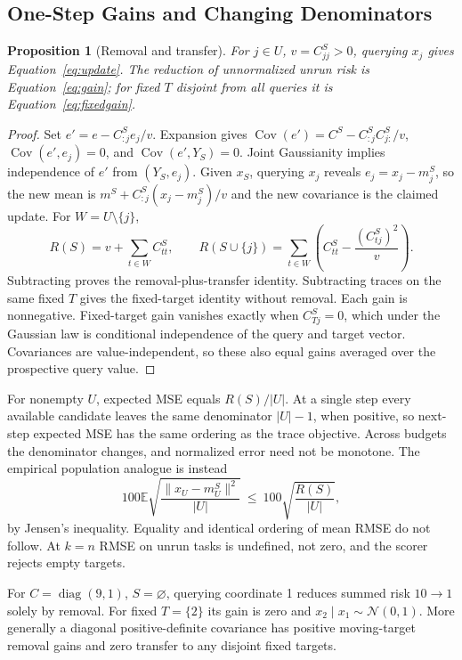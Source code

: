 \documentclass{article}
\newtheorem{proposition}{Proposition}
\newcommand{\E}{\mathbb{E}}
\newcommand{\Cov}{\operatorname{Cov}}
\begin{document}
\subsection{One-Step Gains and Changing Denominators}
\begin{proposition}[Removal and transfer]
For $j\in U$, $v=C^S_{jj}>0$, querying $x_j$ gives Equation~\eqref{eq:update}. The reduction of unnormalized unrun risk is Equation~\eqref{eq:gain}; for fixed $T$ disjoint from all queries it is Equation~\eqref{eq:fixedgain}.
\end{proposition}
\begin{proof}
Set $e'=e-C^S_{:j}e_j/v$. Expansion gives $\Cov(e')=C^S-C^S_{:j}C^S_{j:}/v$, $\Cov(e',e_j)=0$, and $\Cov(e',Y_S)=0$. Joint Gaussianity implies independence of $e'$ from $(Y_S,e_j)$. Given $x_S$, querying $x_j$ reveals $e_j=x_j-m^S_j$, so the new mean is $m^S+C^S_{:j}(x_j-m^S_j)/v$ and the new covariance is the claimed update. For $W=U\setminus\{j\}$,
\begin{equation}
R(S)=v+\sum_{t\in W}C^S_{tt},\qquad
R(S\cup\{j\})=\sum_{t\in W}\left(C^S_{tt}-\frac{(C^S_{tj})^2}{v}\right).
\end{equation}
Subtracting proves the removal-plus-transfer identity. Subtracting traces on the same fixed $T$ gives the fixed-target identity without removal. Each gain is nonnegative. Fixed-target gain vanishes exactly when $C^S_{Tj}=0$, which under the Gaussian law is conditional independence of the query and target vector. Covariances are value-independent, so these also equal gains averaged over the prospective query value.
\end{proof}
For nonempty $U$, expected MSE equals $R(S)/|U|$. At a single step every available candidate leaves the same denominator $|U|-1$, when positive, so next-step expected MSE has the same ordering as the trace objective. Across budgets the denominator changes, and normalized error need not be monotone. The empirical population analogue is instead
\begin{equation}
100\E\sqrt{\frac{\|x_U-m^S_U\|^2}{|U|}}
\ \le\ 100\sqrt{\frac{R(S)}{|U|}},
\end{equation}
by Jensen's inequality. Equality and identical ordering of mean RMSE do not follow. At $k=n$ RMSE on unrun tasks is undefined, not zero, and the scorer rejects empty targets.

For $C=\operatorname{diag}(9,1)$, $S=\varnothing$, querying coordinate 1 reduces summed risk $10\to1$ solely by removal. For fixed $T=\{2\}$ its gain is zero and $x_2\mid x_1\sim\mathcal N(0,1)$. More generally a diagonal positive-definite covariance has positive moving-target removal gains and zero transfer to any disjoint fixed targets.
\end{document}
